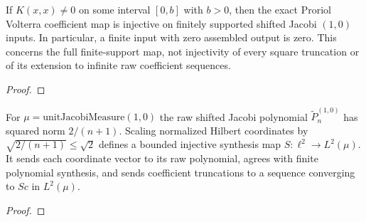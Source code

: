 \begin{supporting}
\begin{theorem}
\label{thm:volterra-finite-injectivity}
\leanok
If $K(x,x)\ne0$ on some interval $[0,b]$ with $b>0$, then the exact
Proriol Volterra coefficient map is injective on finitely supported shifted
Jacobi $(1,0)$ inputs. In particular, a finite input with zero assembled output
is zero. This concerns the full finite-support map, not injectivity of every
square truncation or of its extension to infinite raw coefficient sequences.
\end{theorem}
\begin{proof}
\leanok
\end{proof}

\begin{theorem}
\label{thm:raw-jacobi-synthesis}
\leanok
For $\mu=\mathrm{unitJacobiMeasure}(1,0)$ the raw shifted Jacobi polynomial
$\widetilde P_n^{(1,0)}$ has squared norm $2/(n+1)$. Scaling normalized
Hilbert coordinates by $\sqrt{2/(n+1)}\le\sqrt2$ defines a bounded injective
synthesis map $S:\ell^2\to L^2(\mu)$. It sends each coordinate vector to
its raw polynomial, agrees with finite polynomial synthesis, and sends
coefficient truncations to a sequence converging to $Sc$ in $L^2(\mu)$.

\end{theorem}
\begin{proof}
\leanok
\end{proof}




\end{supporting}
